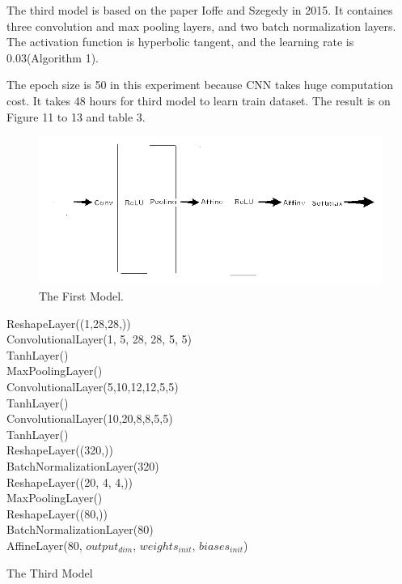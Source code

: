 \documentclass{article}
\begin{document}
The third model is based on the paper Ioffe and Szegedy in 2015. It containes three convolution and max pooling layers, and two batch normalization layers. The activation function is hyperbolic tangent, and the learning rate is 0.03(Algorithm 1).

The epoch size is 50 in this experiment because CNN takes huge computation cost. It takes 48 hours for third model to learn train dataset.
The result is on Figure 11 to 13 and table 3.

\begin{figure}[h]
\vskip 5mm
\begin{center}
\centerline{\includegraphics[width=\columnwidth]{j.png}}
\caption{The First Model.
}
\end{center}
\vskip -5mm
\end{figure}

\begin{algorithm}[h]
\begin{algorithmic}
      \STATE ReshapeLayer((1,28,28,)) \\
      \STATE ConvolutionalLayer(1, 5, 28, 28, 5, 5) \\
      \STATE TanhLayer() \\
      \STATE MaxPoolingLayer()  \\
      \STATE ConvolutionalLayer(5,10,12,12,5,5) \\
      \STATE TanhLayer() \\
      \STATE ConvolutionalLayer(10,20,8,8,5,5) \\
     \STATE TanhLayer() \\
      \STATE ReshapeLayer((320,)) \\
      \STATE BatchNormalizationLayer(320) \\
      \STATE ReshapeLayer((20, 4, 4,)) \\
      \STATE MaxPoolingLayer() \\
      \STATE ReshapeLayer((80,)) \\
      \STATE BatchNormalizationLayer(80) \\
      \STATE AffineLayer(80, $output_{dim}$, $weights_{init}$, $biases_{init}$) \\
\end{algorithmic}
  \caption{The Third Model}
  \label{alg:example}
\end{algorithm}
\end{document}
